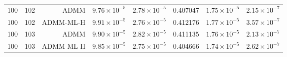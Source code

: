 \begin{longtable}{rrrrrrrr}
\midrule
100 & 102 & ADMM & $9.76\times 10^{-5}$ & $2.78\times 10^{-5}$ & 0.407047 & $1.75\times 10^{-5}$ & $2.15\times 10^{-7}$ \\
100 & 102 & ADMM-ML-H & $9.91\times 10^{-5}$ & $2.76\times 10^{-5}$ & 0.412176 & $1.77\times 10^{-5}$ & $3.57\times 10^{-7}$ \\
\midrule
100 & 103 & ADMM & $9.90\times 10^{-5}$ & $2.82\times 10^{-5}$ & 0.411135 & $1.76\times 10^{-5}$ & $2.13\times 10^{-7}$ \\
100 & 103 & ADMM-ML-H & $9.85\times 10^{-5}$ & $2.75\times 10^{-5}$ & 0.404666 & $1.74\times 10^{-5}$ & $2.62\times 10^{-7}$ \\
\end{longtable}
